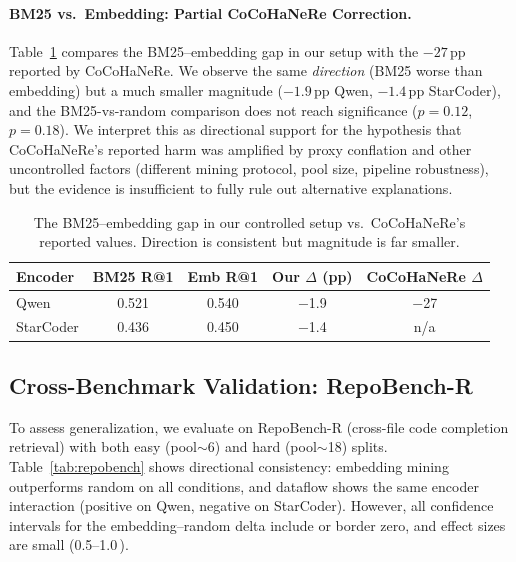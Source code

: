 \documentclass[11pt]{article}
\newcommand{\pp}{\,\text{pp}}
\begin{document}
\paragraph{BM25 vs.\ Embedding: Partial CoCoHaNeRe Correction.}
Table~\ref{tab:bm25-gap} compares the BM25--embedding gap in our setup with the $-27\pp{}$ reported by CoCoHaNeRe.
We observe the same \emph{direction} (BM25 worse than embedding) but a much smaller magnitude ($-1.9\pp{}$ Qwen, $-1.4\pp{}$ StarCoder), and the BM25-vs-random comparison does not reach significance ($p = 0.12$, $p = 0.18$).
We interpret this as directional support for the hypothesis that CoCoHaNeRe's reported harm was amplified by proxy conflation and other uncontrolled factors (different mining protocol, pool size, pipeline robustness), but the evidence is insufficient to fully rule out alternative explanations.

\begin{table}[t]
\centering
\caption{The BM25--embedding gap in our controlled setup vs.\ CoCoHaNeRe's reported values. Direction is consistent but magnitude is far smaller.}
\label{tab:bm25-gap}
\begin{tabular}{lcccc}
\toprule
Encoder & BM25 R@1 & Emb R@1 & Our $\Delta$ (pp) & CoCoHaNeRe $\Delta$ \\
\midrule
Qwen     & 0.521 & 0.540 & $-$1.9 & $-$27 \\
StarCoder & 0.436 & 0.450 & $-$1.4 & n/a \\
\bottomrule
\end{tabular}
\end{table}

\subsection{Cross-Benchmark Validation: RepoBench-R}
\label{sec:repobench}

To assess generalization, we evaluate on RepoBench-R (cross-file code completion retrieval) with both easy (pool$\sim$6) and hard (pool$\sim$18) splits.
Table~\ref{tab:repobench} shows directional consistency: embedding mining outperforms random on all conditions, and dataflow shows the same encoder interaction (positive on Qwen, negative on StarCoder).
However, all confidence intervals for the embedding--random delta include or border zero, and effect sizes are small (0.5--1.0\pp{}).
\end{document}
